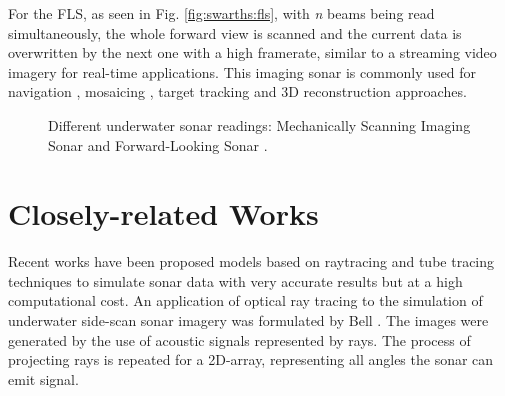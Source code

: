 \documentclass[final,5p,times]{elsarticle}
\begin{document}
For the FLS, as seen in Fig. \ref{fig:swarths:fls}, with \textit{n} beams being read simultaneously, the whole forward view is scanned and the current data is overwritten by the next one with a high framerate, similar to a streaming video imagery for real-time applications. This imaging sonar is commonly used for navigation \cite{fallon2013}, mosaicing \cite{hurtos2014a}, target tracking \cite{liu2016} and 3D reconstruction \cite{huang2015} approaches.

\begin{figure}[h]
    \centering
    \captionsetup{justification=centering}
    \caption{Different underwater sonar readings: Mechanically Scanning Imaging Sonar  and Forward-Looking Sonar .}
    \label{fig:sonar_devices}
\end{figure}


\section{Closely-related Works}
\label{relatedworks}

Recent works have been proposed models based on raytracing and tube tracing techniques to simulate sonar data with very accurate results but at a high computational cost. An application of optical ray tracing to the simulation of underwater side-scan sonar imagery was formulated by Bell \cite{bell1997}. The images were generated by the use of acoustic signals represented by rays. The process of projecting rays is repeated for a 2D-array, representing all angles the sonar can emit signal.
\end{document}
